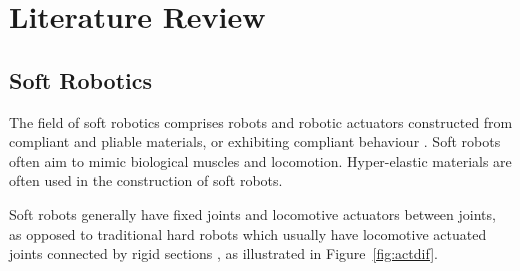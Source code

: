 \chapter{Literature Review}
\label{chp:LR}

\section{Soft Robotics}

The field of soft robotics comprises robots and robotic actuators constructed from compliant and pliable materials, or exhibiting compliant behaviour \cite{Wang2015, Ilievski2011}. Soft robots often aim to mimic biological muscles and locomotion. Hyper-elastic materials are often used in the construction of soft robots.

Soft robots generally have fixed joints and locomotive actuators between joints, as opposed to traditional hard robots which usually have locomotive actuated joints connected by rigid sections \cite{Whitesides2018}, as illustrated in Figure~\ref{fig:actdif}.

